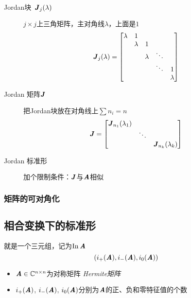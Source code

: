 \begin{definition}
    \begin{description}
        \item[Jordan块\, $\boldsymbol{\mathit{J}}_{j}(\lambda)$] $j \times j$上三角矩阵，主对角线$\lambda$，上面是$1$
            $$ \boldsymbol{\mathit{J}}_{j}(\lambda) = \begin{bmatrix}
                \lambda     &   1       &             &              &          \\
                            &   \lambda &   1         &              &          \\
                            &           &   \lambda   &   \ddots     &          \\
                            &           &             &   \ddots     &     1    \\
                            &           &             &              &     \lambda
            \end{bmatrix} $$
        \item[Jordan 矩阵$\boldsymbol{\mathit{J}}$] 把Jordan块放在对角线上$\sum n_i = n$ $$
            \boldsymbol{\mathit{J}} = \begin{bmatrix}
                \boldsymbol{\mathit{J}}_{n_1}(\lambda_1)     &           &           \\
                                        & \ddots    &           \\
                                        &           & \boldsymbol{\mathit{J}}_{n_k}(\lambda_k)
            \end{bmatrix}
            $$
        \item[Jordan 标准形] 加个限制条件：$\boldsymbol{\mathit{J}}$与$\MA$相似
    \end{description}
\end{definition}

\subsubsection{矩阵的可对角化}
\label{ssub:ju_zhen_de_ke_dui_jiao_hua_}

\begin{definition}
\end{definition}

\subsection{相合变换下的标准形}
\label{sub:相合变换下的标准形}

\begin{definition}[$\MA$的惯性]
    就是一个三元组，记为$\mathrm{In}\, \boldsymbol{\mathit{A}}$
    \[
        (i_{+}(\boldsymbol{\mathit{A}}), i_{-}(\boldsymbol{\mathit{A}}), i_{0}(\boldsymbol{\mathit{A}}))
    \]
\begin{itemize}
    \item $\boldsymbol{\mathit{A}} \in \mathbb{C}^{n \times n}$为对称矩阵 \emph{ Hermite矩阵 }
    \item $i_{+}(\boldsymbol{\mathit{A}})$, $i_{-}(\boldsymbol{\mathit{A}})$, $i_{0}(\boldsymbol{\mathit{A}})$分别为$\MA$的正、负和零特征值的个数
\end{itemize}
\end{definition}

